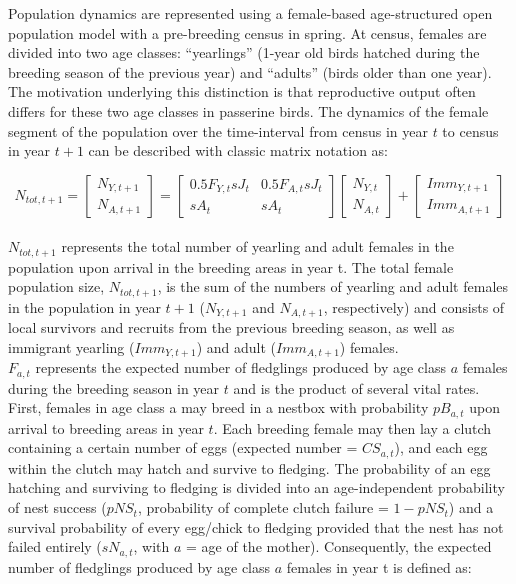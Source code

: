 \documentclass[
]{book}
\begin{document}
Population dynamics are represented using a female-based age-structured open
population model with a pre-breeding census in spring. At census, females are
divided into two age classes: ``yearlings'' (1-year old birds hatched during the
breeding season of the previous year) and ``adults'' (birds older than one year).
The motivation underlying this distinction is that reproductive output often
differs for these two age classes in passerine birds.
The dynamics of the female segment of the population over the time-interval from
census in year \(t\) to census in year \(t+1\) can be described with classic matrix
notation \citep{Caswell2001} as:

\[N_{tot,t+1} = \begin{bmatrix} N_{Y,t+1} \\ N_{A,t+1} \end{bmatrix} =
  \begin{bmatrix}
0.5F_{Y,t}sJ_t & 0.5F_{A,t}sJ_t \\
sA_t & sA_t
\end{bmatrix}\begin{bmatrix} N_{Y,t} \\ N_{A,t} \end{bmatrix} +
  \begin{bmatrix} Imm_{Y,t+1} \\ Imm_{A,t+1} \end{bmatrix}\]\\

\(N_{tot,t+1}\) represents the total number of yearling and adult females in the
population upon arrival in the breeding areas in year t. The total female
population size, \(N_{tot,t+1}\), is the sum of the numbers of yearling and adult
females in the population in year \(t+1\) (\(N_{Y,t+1}\) and \(N_{A,t+1}\),
respectively) and consists of local survivors and recruits from the previous
breeding season, as well as immigrant yearling (\(Imm_{Y,t+1}\)) and adult
(\(Imm_{A,t+1}\)) females.\\

\(F_{a,t}\) represents the expected number of fledglings produced by age class \(a\)
females during the breeding season in year \(t\) and is the product of several
vital rates. First, females in age class a may breed in a nestbox with
probability \(pB_{a,t}\) upon arrival to breeding areas in year \(t\). Each breeding
female may then lay a clutch containing a certain number of eggs (expected
number = \(CS_{a,t}\)), and each egg within the clutch may hatch and survive to
fledging. The probability of an egg hatching and surviving to fledging is
divided into an age-independent probability of nest success (\(pNS_t\),
probability of complete clutch failure = \(1-pNS_t\)) and a survival probability
of every egg/chick to fledging provided that the nest has not failed entirely
(\(sN_{a,t}\), with \(a\) = age of the mother). Consequently, the expected number of
fledglings produced by age class \(a\) females in year t is defined as:
\end{document}
